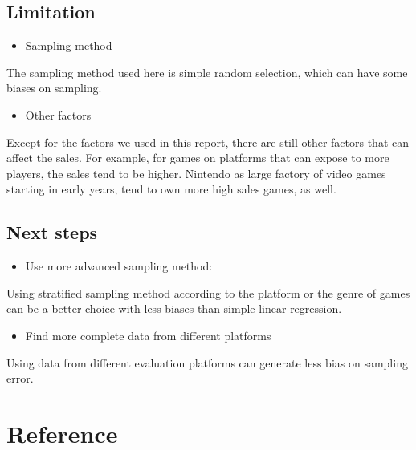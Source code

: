 \documentclass[
]{article}
\providecommand{\tightlist}{%
  \setlength{\itemsep}{0pt}\setlength{\parskip}{0pt}}
\begin{document}
\hypertarget{limitation}{%
\subsection{Limitation}\label{limitation}}

\begin{itemize}
\tightlist
\item
  Sampling method
\end{itemize}

The sampling method used here is simple random selection, which can have
some biases on sampling.

\begin{itemize}
\tightlist
\item
  Other factors
\end{itemize}

Except for the factors we used in this report, there are still other
factors that can affect the sales. For example, for games on platforms
that can expose to more players, the sales tend to be higher. Nintendo
as large factory of video games starting in early years, tend to own
more high sales games, as well.

\hypertarget{next-steps}{%
\subsection{Next steps}\label{next-steps}}

\begin{itemize}
\tightlist
\item
  Use more advanced sampling method:
\end{itemize}

Using stratified sampling method according to the platform or the genre
of games can be a better choice with less biases than simple linear
regression.

\begin{itemize}
\tightlist
\item
  Find more complete data from different platforms
\end{itemize}

Using data from different evaluation platforms can generate less bias on
sampling error.

\hypertarget{reference}{%
\section*{Reference}\label{reference}}
\end{document}
